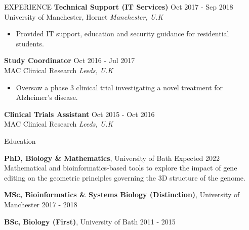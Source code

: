 \documentclass{resume} %
\begin{document}
\begin{rSection}{EXPERIENCE}
\textbf{Technical Support (IT Services)} \hfill Oct 2017 - Sep 2018 \\
University of Manchester, Hornet \hfill \textit{Manchester, U.K}
 \begin{itemize}
    \itemsep -3pt {} 
    \item Provided IT support, education and security guidance for residential students.
 \end{itemize}

\textbf{Study Coordinator} \hfill Oct 2016 - Jul 2017 \\
MAC Clinical Research \hfill \textit{Leeds, U.K}
 \begin{itemize}
    \itemsep -3pt {} 
    \item Oversaw a phase 3 clinical trial investigating a novel treatment for Alzheimer’s disease.
 \end{itemize}

\textbf{Clinical Trials Assistant} \hfill Oct 2015 - Oct 2016 \\
MAC Clinical Research \hfill \textit{Leeds, U.K}

\end{rSection} 


\begin{rSection}{Education}

{\bf PhD, Biology \& Mathematics}, University of Bath \hfill {Expected 2022} \\
Mathematical and bioinformatics-based tools to explore the impact of gene editing on the geometric principles governing the 3D structure of the genome.

{\bf MSc, Bioinformatics \& Systems Biology (Distinction)}, University of Manchester \hfill {2017 - 2018}

{\bf BSc, Biology (First)}, University of Bath \hfill {2011 - 2015}

\end{rSection}

\end{document}
